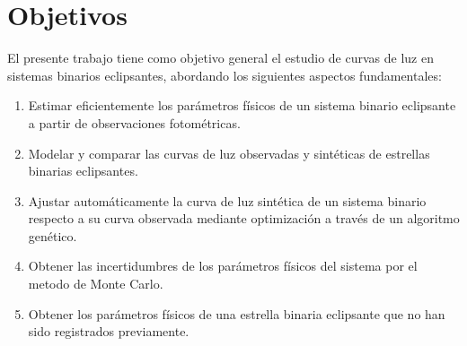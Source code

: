 \chapter*{Objetivos}

El presente trabajo tiene como objetivo general el estudio de curvas de luz en sistemas binarios eclipsantes, abordando los siguientes aspectos fundamentales: 

\begin{enumerate}
\item Estimar eficientemente los parámetros físicos de un sistema binario eclipsante a partir de observaciones fotométricas.
\item Modelar y comparar las curvas de luz observadas y sintéticas de estrellas binarias eclipsantes.
\item Ajustar automáticamente la curva de luz sintética de un sistema binario respecto a su curva observada mediante optimización a través de un algoritmo genético.
\item Obtener las incertidumbres de los parámetros físicos del sistema por el metodo de Monte Carlo.
\item Obtener los parámetros físicos de una estrella binaria eclipsante que no han sido registrados previamente.
\end{enumerate}


